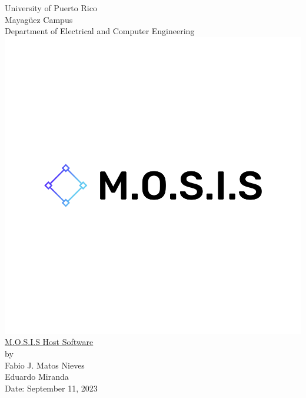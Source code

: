 \begin{titlepage}
  \begin{center}
    \large{University of Puerto Rico\\
    Mayagüez Campus\\
    \vspace{\baselineskip}
    Department of Electrical and Computer Engineering\\}
  \vspace{1.0cm}
  \includegraphics[scale=0.2]{../M.O.S.I.S Logo/default.png}
    \Huge{\underline{M.O.S.I.S Host Software}\\}
    \vspace{1.5\baselineskip}
    \large by\\
    \vspace{\baselineskip}
    Fabio J. Matos Nieves\\
    Eduardo Miranda\\
    \vspace{4.0cm}
    Date: September 11, 2023\\
    \normalsize

  \end{center}
\end{titlepage}
